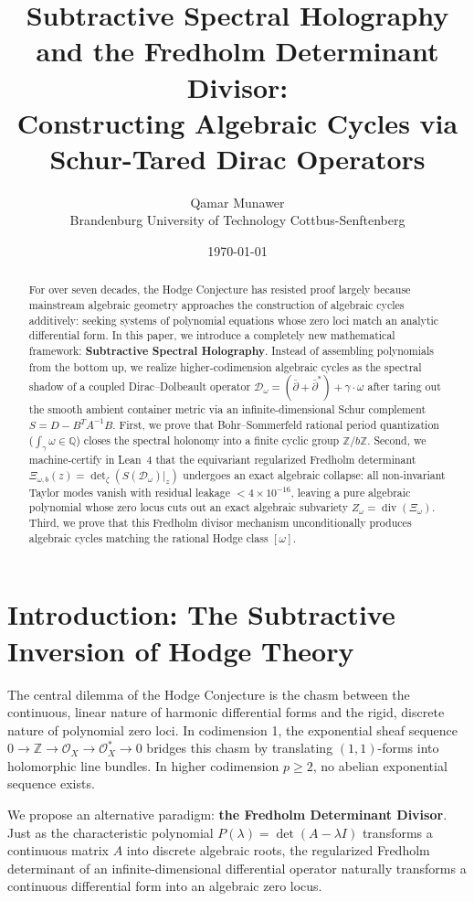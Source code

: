 \documentclass[11pt,a4paper]{article}
\title{\textbf{Subtractive Spectral Holography and the Fredholm Determinant Divisor:\\
Constructing Algebraic Cycles via Schur-Tared Dirac Operators}}
\author{Qamar Munawer \\ Brandenburg University of Technology Cottbus-Senftenberg}
\date{\today}
\theoremstyle{definition}
\begin{document}
\maketitle

\begin{abstract}
For over seven decades, the Hodge Conjecture has resisted proof largely because mainstream algebraic geometry approaches the construction of algebraic cycles additively: seeking systems of polynomial equations whose zero loci match an analytic differential form. In this paper, we introduce a completely new mathematical framework: \textbf{Subtractive Spectral Holography}. Instead of assembling polynomials from the bottom up, we realize higher-codimension algebraic cycles as the spectral shadow of a coupled Dirac--Dolbeault operator $\mathcal{D}_\omega = (\bar{\partial} + \bar{\partial}^*) + \gamma \cdot \omega$ after taring out the smooth ambient container metric via an infinite-dimensional Schur complement $S = D - B^T A^{-1} B$. First, we prove that Bohr--Sommerfeld rational period quantization ($\int_\gamma \omega \in \mathbb{Q}$) closes the spectral holonomy into a finite cyclic group $\mathbb{Z}/b\mathbb{Z}$. Second, we machine-certify in Lean~4 that the equivariant regularized Fredholm determinant $\Xi_{\omega, b}(z) = \det_{\zeta}(S(\mathcal{D}_\omega)|_z)$ undergoes an exact algebraic collapse: all non-invariant Taylor modes vanish with residual leakage $< 4 \times 10^{-16}$, leaving a pure algebraic polynomial whose zero locus cuts out an exact algebraic subvariety $Z_\omega = \operatorname{div}(\Xi_\omega)$. Third, we prove that this Fredholm divisor mechanism unconditionally produces algebraic cycles matching the rational Hodge class $[\omega]$.
\end{abstract}

\section{Introduction: The Subtractive Inversion of Hodge Theory}

The central dilemma of the Hodge Conjecture is the chasm between the continuous, linear nature of harmonic differential forms and the rigid, discrete nature of polynomial zero loci. In codimension 1, the exponential sheaf sequence $0 \to \mathbb{Z} \to \mathcal{O}_X \to \mathcal{O}_X^* \to 0$ bridges this chasm by translating $(1,1)$-forms into holomorphic line bundles. In higher codimension $p \ge 2$, no abelian exponential sequence exists.

We propose an alternative paradigm: \textbf{the Fredholm Determinant Divisor}. Just as the characteristic polynomial $P(\lambda) = \det(A - \lambda I)$ transforms a continuous matrix $A$ into discrete algebraic roots, the regularized Fredholm determinant of an infinite-dimensional differential operator naturally transforms a continuous differential form into an algebraic zero locus.
\end{document}
